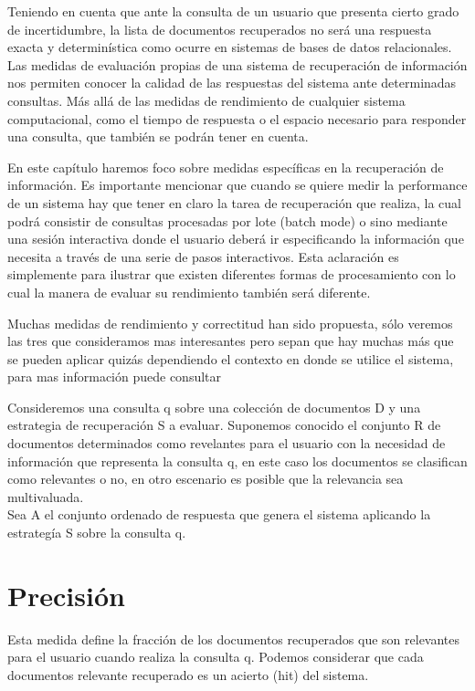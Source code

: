 
Teniendo en cuenta que ante la consulta de un usuario que presenta cierto grado de incertidumbre, la lista de documentos recuperados no será una respuesta exacta y determinística como ocurre en sistemas de bases de datos relacionales. Las medidas de evaluación propias de una sistema de recuperación de información nos permiten conocer la calidad de las respuestas del sistema ante determinadas consultas. Más allá de las medidas de rendimiento de cualquier sistema computacional, como el tiempo de respuesta o el espacio necesario para responder una consulta, que también se podrán tener en cuenta. \par

En este capítulo haremos foco sobre medidas específicas en la recuperación de información. Es importante mencionar que cuando se quiere medir la performance de un sistema hay que tener en claro la tarea de recuperación que realiza, la cual podrá consistir de consultas procesadas por lote (batch mode) o sino mediante una sesión interactiva donde el usuario deberá ir especificando la información que necesita a través de una serie de pasos interactivos. Esta aclaración es simplemente para ilustrar que existen diferentes formas de procesamiento con lo cual la manera de evaluar su rendimiento también será diferente. \par

Muchas medidas de rendimiento y correctitud han sido propuesta, sólo veremos las tres que consideramos mas interesantes pero sepan que hay muchas más que se pueden aplicar quizás dependiendo el contexto en donde se utilice el sistema, para mas información puede consultar \cite{baeza1999} \par

Consideremos una consulta q sobre una colección de documentos D y una estrategia de recuperación S a evaluar. Suponemos conocido el conjunto R de documentos determinados como revelantes para el usuario con la necesidad de información que representa la consulta q, en este caso los documentos se clasifican como relevantes o no, en otro escenario es posible que la relevancia sea multivaluada. \\

Sea A el conjunto ordenado de respuesta que genera el sistema aplicando la estrategía S sobre la consulta q.

\section{Precisión}
Esta medida define la fracción de los documentos recuperados que son relevantes para el usuario cuando realiza la consulta q. Podemos considerar que cada documentos relevante recuperado es un acierto (hit) del sistema. \\

